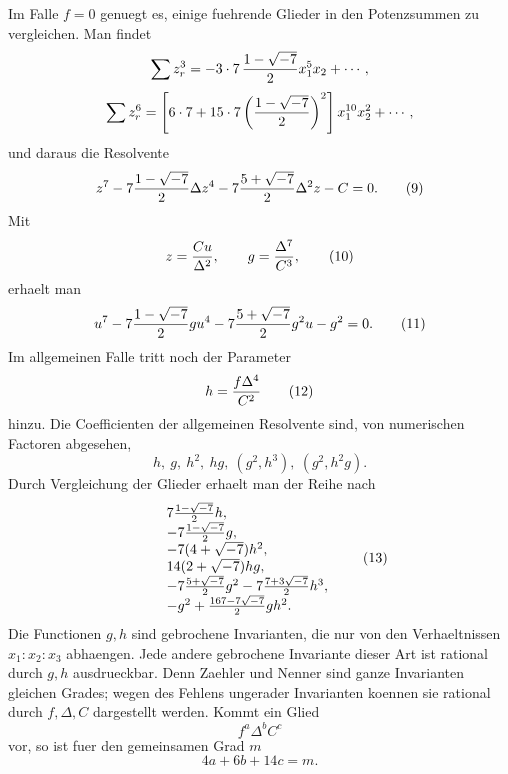 \documentclass[11pt]{article}
\begin{document}
Im Falle \(f=0\) genuegt es, einige fuehrende Glieder in den Potenzsummen zu vergleichen. Man findet
\begin{equation}
\sum z_r^3=-3\cdot7\,{1-\sqrt{-7}\over2}x_1^5x_2+\cdots,
\end{equation}
\begin{equation}
\sum z_r^6=\left[6\cdot7+15\cdot7\left({1-\sqrt{-7}\over2}\right)^2\right]x_1^{10}x_2^2+\cdots,
\end{equation}
und daraus die Resolvente
\begin{equation}
z^7-7{1-\sqrt{-7}\over2}\Delta z^4-7{5+\sqrt{-7}\over2}\Delta^2z-C=0.
\tag{9}
\end{equation}
Mit
\begin{equation}
z={Cu\over\Delta^2},\qquad g={\Delta^7\over C^3},
\tag{10}
\end{equation}
erhaelt man
\begin{equation}
u^7-7{1-\sqrt{-7}\over2}g u^4-7{5+\sqrt{-7}\over2}g^2u-g^2=0.
\tag{11}
\end{equation}
Im allgemeinen Falle tritt noch der Parameter
\begin{equation}
h={f\Delta^4\over C^2}
\tag{12}
\end{equation}
hinzu. Die Coefficienten der allgemeinen Resolvente sind, von numerischen Factoren abgesehen,
\begin{equation}
h,\ g,\ h^2,\ hg,\ (g^2,h^3),\ (g^2,h^2g).
\end{equation}
Durch Vergleichung der Glieder erhaelt man der Reihe nach
\begin{equation}
\begin{array}{rcl}
&& 7{1-\sqrt{-7}\over2}h,\\
&&-7{1-\sqrt{-7}\over2}g,\\
&&-7(4+\sqrt{-7})h^2,\\
&&14(2+\sqrt{-7})hg,\\
&&-7{5+\sqrt{-7}\over2}g^2-7{7+3\sqrt{-7}\over2}h^3,\\
&&-g^2+{167-7\sqrt{-7}\over2}gh^2.
\end{array}
\tag{13}
\end{equation}
Die Functionen \(g,h\) sind gebrochene Invarianten, die nur von den Verhaeltnissen \(x_1:x_2:x_3\) abhaengen. Jede andere gebrochene Invariante dieser Art ist rational durch \(g,h\) ausdrueckbar. Denn Zaehler und Nenner sind ganze Invarianten gleichen Grades; wegen des Fehlens ungerader Invarianten koennen sie rational durch \(f,\Delta,C\) dargestellt werden. Kommt ein Glied
\begin{equation}
f^a\Delta^b C^c
\end{equation}
vor, so ist fuer den gemeinsamen Grad \(m\)
\begin{equation}
4a+6b+14c=m.
\tag{14}
\end{equation}
\end{document}
